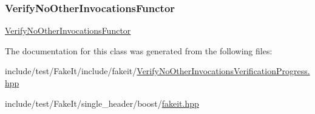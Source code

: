 \subsubsection{\texorpdfstring{VerifyNoOtherInvocationsFunctor}{VerifyNoOtherInvocationsFunctor}}
{\footnotesize\ttfamily \mbox{\hyperlink{classfakeit_1_1VerifyNoOtherInvocationsFunctor}{Verify\+No\+Other\+Invocations\+Functor}}\hspace{0.3cm}{\ttfamily [friend]}}



The documentation for this class was generated from the following files\+:\begin{DoxyCompactItemize}
\item 
include/test/\+Fake\+It/include/fakeit/\mbox{\hyperlink{VerifyNoOtherInvocationsVerificationProgress_8hpp}{Verify\+No\+Other\+Invocations\+Verification\+Progress.\+hpp}}\item 
include/test/\+Fake\+It/single\+\_\+header/boost/\mbox{\hyperlink{single__header_2boost_2fakeit_8hpp}{fakeit.\+hpp}}\end{DoxyCompactItemize}
